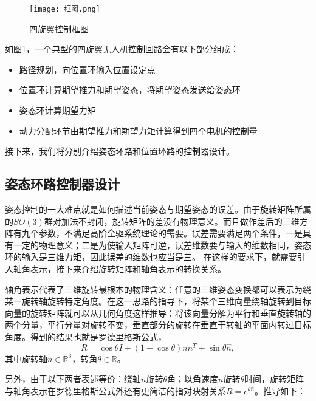 \begin{figure}[!h]
    \centering
    \texttt{[image: 框图.png]}
    \caption{四旋翼控制框图}
    \label{框图}
  \end{figure}
如图\ref{框图}，一个典型的四旋翼无人机控制回路会有以下部分组成：
\begin{itemize}
     \item 路径规划，向位置环输入位置设定点
     \item 位置环计算期望推力和期望姿态，将期望姿态发送给姿态环
     \item 姿态环计算期望力矩
     \item 动力分配环节由期望推力和期望力矩计算得到四个电机的控制量
   \end{itemize}

   接下来，我们将分别介绍姿态环路和位置环路的控制器设计。
\subsection*{姿态环路控制器设计}
姿态控制的一大难点就是如何描述当前姿态与期望姿态的误差。由于旋转矩阵所属的$SO(3)$群对加法不封闭，旋转矩阵的差没有物理意义。而且做作差后的三维方阵有九个参数，不满足高阶全驱系统理论的需要。误差需要满足两个条件，一是具有一定的物理意义；二是为使输入矩阵可逆，误差维数要与输入的维数相同，姿态环的输入是三维力矩，因此误差的维数也应当是三。
在这样的要求下，就需要引入轴角表示，接下来介绍旋转矩阵和轴角表示的转换关系。

轴角表示代表了三维旋转最根本的物理含义：任意的三维姿态变换都可以表示为绕某一旋转轴旋转特定角度。在这一思路的指导下，将某个三维向量绕轴旋转到目标向量的旋转矩阵就可以从几何角度这样推导：将该向量分解为平行和垂直旋转轴的两个分量，平行分量对旋转不变，垂直部分的旋转在垂直于转轴的平面内转过目标角度。得到的结果也就是罗德里格斯公式\cite{Rodrigues1840}，
\begin{equation}
  R=\cos \theta I+(1- \cos \theta)nn^T+\sin\theta \widehat n,
  \label{equ:Rodrigue}
\end{equation}
其中旋转轴$n \in \mathbb{R}^{3}$，转角$\theta \in \mathbb{R}$。

另外，由于以下两者表述等价：绕轴$n$旋转$\theta$角；以角速度$n$旋转$\theta$时间，旋转矩阵与轴角表示在罗德里格斯公式外还有更简洁的指对映射关系$R=e^{\theta \widehat n}$。推导如下：


